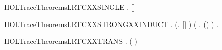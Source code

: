 \newcommand{\HOLTraceTheoremsLRTCXXRULES}{\UseVerbatim{HOLTraceTheoremsLRTCXXRULES}}
\begin{SaveVerbatim}{HOLTraceTheoremsLRTCXXSINGLE}
\HOLTokenTurnstile{} \HOLSymConst{\HOLTokenForall{}}   .     \HOLSymConst{\HOLTokenImp{}}    [] 
\end{SaveVerbatim}
\newcommand{\HOLTraceTheoremsLRTCXXSINGLE}{\UseVerbatim{HOLTraceTheoremsLRTCXXSINGLE}}
\begin{SaveVerbatim}{HOLTraceTheoremsLRTCXXSTRONGXXINDUCT}
\HOLTokenTurnstile{} \HOLSymConst{\HOLTokenForall{}} .
       (\HOLSymConst{\HOLTokenForall{}}.   [] ) \HOLSymConst{\HOLTokenConj{}}
       (\HOLSymConst{\HOLTokenForall{}}    .
                \HOLSymConst{\HOLTokenConj{}}      \HOLSymConst{\HOLTokenConj{}}     \HOLSymConst{\HOLTokenImp{}}   (\HOLSymConst{::}) ) \HOLSymConst{\HOLTokenImp{}}
       \HOLSymConst{\HOLTokenForall{}}  .      \HOLSymConst{\HOLTokenImp{}}    
\end{SaveVerbatim}
\newcommand{\HOLTraceTheoremsLRTCXXSTRONGXXINDUCT}{\UseVerbatim{HOLTraceTheoremsLRTCXXSTRONGXXINDUCT}}
\begin{SaveVerbatim}{HOLTraceTheoremsLRTCXXTRANS}
\HOLTokenTurnstile{} \HOLSymConst{\HOLTokenForall{}}     .
            \HOLSymConst{\HOLTokenConj{}}      \HOLSymConst{\HOLTokenImp{}}    ( \HOLSymConst{++} ) 
\end{SaveVerbatim}
\newcommand{\HOLTraceTheoremsLRTCXXTRANS}{\UseVerbatim{HOLTraceTheoremsLRTCXXTRANS}}
